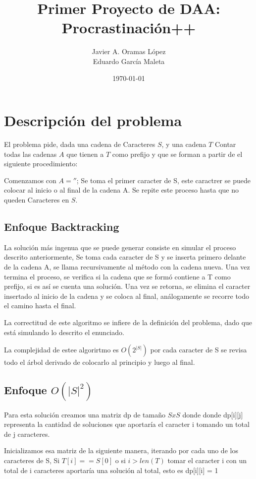 \documentclass{article}
\title{Primer Proyecto de DAA: Procrastinación++}
\author{
    Javier A. Oramas López \\
    Eduardo García Maleta
}
\date{\today}
\begin{document}
\maketitle

\section{Descripción del problema}

El problema pide, dada una cadena de Caracteres $S$, y una cadena $T$
Contar todas las cadenas $A$ que tienen a $T$ como prefijo y que se forman a partir de el siguiente procedimiento:

Comenzamos con $A = ''$; 
Se toma el primer caracter de S, este caractrer se puede colocar al inicio o al final de la cadena A.
Se repite este proceso hasta que no queden Caracteres en $S$.

\subsection{Enfoque Backtracking}
La solución más ingenua que se puede generar consiste en simular el proceso descrito anteriormente,
Se toma cada caracter de S y se inserta primero delante de la cadena A, se llama recursivamente al método con la cadena nueva.
Una vez termina el proceso, se verifica si la cadena que se formó contiene a T como prefijo, si es así se cuenta una solución.
Una vez se retorna, se elimina el caracter insertado al inicio de la cadena y se coloca al final, análogamente se recorre todo el camino hasta el final.

La correctitud de este algoritmo se infiere de la definición del problema, dado que está simulando lo descrito el enunciado.

La complejidad de estee algorirtmo es $O(2^{|S|})$ por cada caracter de S se revisa todo el árbol derivado de colocarlo al principio y luego al final.

\subsection{Enfoque $O(|S|^2)$}
Para esta solución creamos una matriz dp de tamaño $SxS$ donde
donde dp[i][j] representa la cantidad de soluciones que aportaría el caracter i
tomando un total de j caracteres.

Inicializamos esa matriz de la siguiente manera,
iterando por cada uno de los caracteres de S,
Si $T[i] == S[0]$ o si $i > len(T)$ tomar el caracter i con un 
total de i caracteres aportaría una solución al total, esto es dp[i][i] = 1
\end{document}
